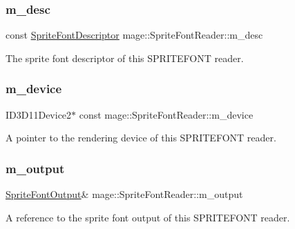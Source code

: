 \subsubsection{\texorpdfstring{m\+\_\+desc}{m\_desc}}
{\footnotesize\ttfamily const \hyperlink{structmage_1_1_sprite_font_descriptor}{Sprite\+Font\+Descriptor} mage\+::\+Sprite\+Font\+Reader\+::m\+\_\+desc\hspace{0.3cm}{\ttfamily [private]}}

The sprite font descriptor of this S\+P\+R\+I\+T\+E\+F\+O\+NT reader. \hypertarget{classmage_1_1_sprite_font_reader_aa77ee2a35b9ad15d5c1abfc6ffe5810c}{}\label{classmage_1_1_sprite_font_reader_aa77ee2a35b9ad15d5c1abfc6ffe5810c} 
\subsubsection{\texorpdfstring{m\+\_\+device}{m\_device}}
{\footnotesize\ttfamily I\+D3\+D11\+Device2$\ast$ const mage\+::\+Sprite\+Font\+Reader\+::m\+\_\+device\hspace{0.3cm}{\ttfamily [private]}}

A pointer to the rendering device of this S\+P\+R\+I\+T\+E\+F\+O\+NT reader. \hypertarget{classmage_1_1_sprite_font_reader_a3df62ce71f85745c493b142c726261b3}{}\label{classmage_1_1_sprite_font_reader_a3df62ce71f85745c493b142c726261b3} 
\subsubsection{\texorpdfstring{m\+\_\+output}{m\_output}}
{\footnotesize\ttfamily \hyperlink{structmage_1_1_sprite_font_output}{Sprite\+Font\+Output}\& mage\+::\+Sprite\+Font\+Reader\+::m\+\_\+output\hspace{0.3cm}{\ttfamily [private]}}

A reference to the sprite font output of this S\+P\+R\+I\+T\+E\+F\+O\+NT reader. 